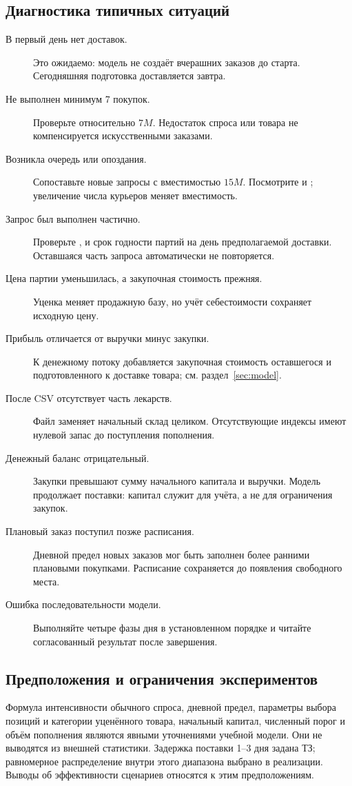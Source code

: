 \subsection{Диагностика типичных ситуаций}
\begin{description}
  \item[В первый день нет доставок.] Это ожидаемо: модель не создаёт
  вчерашних заказов до старта. Сегодняшняя подготовка доставляется завтра.
  \item[Не выполнен минимум 7 покупок.] Проверьте 
  относительно $7M$. Недостаток спроса или товара не компенсируется
  искусственными заказами.
  \item[Возникла очередь или опоздания.] Сопоставьте новые запросы
  с вместимостью $15M$. Посмотрите  и
  ; увеличение числа курьеров меняет вместимость.
  \item[Запрос был выполнен частично.] Проверьте ,
   и срок годности партий на день предполагаемой доставки.
  Оставшаяся часть запроса автоматически не повторяется.
  \item[Цена партии уменьшилась, а закупочная стоимость прежняя.]
  Уценка меняет продажную базу, но учёт себестоимости сохраняет исходную цену.
  \item[Прибыль отличается от выручки минус закупки.]
  К денежному потоку добавляется закупочная стоимость оставшегося и
  подготовленного к доставке товара; см. раздел~\ref{sec:model}.
  \item[После CSV отсутствует часть лекарств.]
  Файл заменяет начальный склад целиком. Отсутствующие индексы имеют нулевой
  запас до поступления пополнения.
  \item[Денежный баланс отрицательный.]
  Закупки превышают сумму начального капитала и выручки. Модель продолжает
  поставки: капитал служит для учёта, а не для ограничения закупок.
  \item[Плановый заказ поступил позже расписания.]
  Дневной предел новых заказов мог быть заполнен более ранними плановыми
  покупками. Расписание сохраняется до появления свободного места.
  \item[Ошибка последовательности модели.] Выполняйте четыре фазы дня
  в установленном порядке и читайте согласованный результат после завершения.
\end{description}

\subsection{Предположения и ограничения экспериментов}
Формула интенсивности обычного спроса, дневной предел, параметры выбора
позиций и категории уценённого товара, начальный капитал, численный порог
и объём пополнения являются явными уточнениями учебной модели.
Они не выводятся из внешней статистики. Задержка поставки 1--3 дня задана ТЗ;
равномерное распределение внутри этого диапазона выбрано в реализации.
Выводы об эффективности сценариев относятся к этим предположениям.

